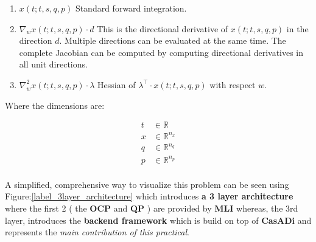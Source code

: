 \documentclass[12pt, letterpaper]{article}
\begin{document}
\begin{enumerate}[label=\textbf{S.\arabic*}]  
\item \label{label_forward_integration} \boldmath$x(t;t,s,q,p)$
        Standard forward integration.
  \item \label{label_directional_derivative} \boldmath$\nabla_{w} x(t;t,s,q,p)\cdot d$
        This is the directional derivative of $x(t;t,s,q,p)$ in the direction $d$. Multiple directions can be evaluated at the same time. The complete Jacobian can be computed by computing directional derivatives in all unit directions.
  \item \label{label_Hessian} \boldmath$\nabla^2_{w} x(t;t,s,q,p) \cdot \lambda$
        Hessian of $\lambda^\top \cdot x(t;t,s,q,p)$ with respect $w$.
\end{enumerate}

Where the dimensions are:

\begin{subequations}
\begin{align}
  t &\in \mathbb{R}                \\
  x &\in \mathbb{R}^{n_x}         \\
  q &\in \mathbb{R}^{n_q}         \\
  p &\in \mathbb{R}^{n_p}         \\
\end{align}
\end{subequations}

A simplified, comprehensive way to visualize this problem can be seen using Figure:\ref{label_3layer_architecture} which introduces \textbf{a 3 layer architecture} where the first 2 ( the \textbf{OCP} and \textbf{QP} ) are provided by \textbf{MLI} whereas, the 3rd layer, introduces the \textbf{backend framework} which is build on top of \textbf{CasADi} and represents the \textit{main contribution of this practical}. \\
\end{document}
